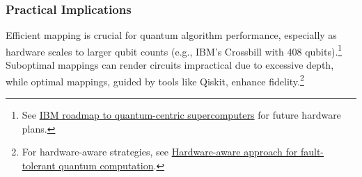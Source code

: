 
\subsubsection*{Practical Implications}

Efficient mapping is crucial for quantum algorithm performance, especially as
hardware scales to larger qubit counts (e.g., IBM’s Crossbill with 408
qubits).\footnote{See \href{https://www.ibm.com/quantum/blog/ibm-quantum-roadmap-2025}
{IBM roadmap to quantum-centric supercomputers} for future hardware plans.}
Suboptimal mappings can render circuits impractical due to excessive depth,
while optimal mappings, guided by tools like Qiskit, enhance fidelity.\footnote{
  For hardware-aware strategies, see \href{https://www.ibm.com/blogs/research/2020/09/hardware-aware-quantum/}
{Hardware-aware approach for fault-tolerant quantum computation}.}


